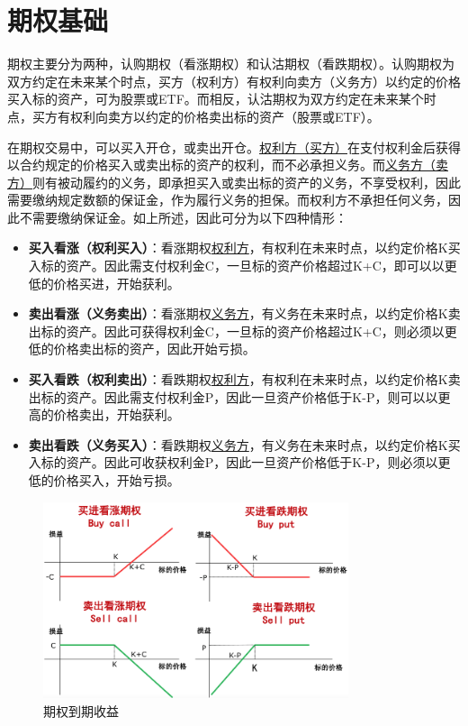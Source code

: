 \documentclass[11pt]{article}
\begin{document}
\maketitle
\tableofcontents

\section{期权基础}

期权主要分为两种，认购期权（看涨期权）和认沽期权（看跌期权）。认购期权为双方约定在未来某个时点，买方（权利方）有权利向卖方（义务方）以约定的价格买入标的资产，可为股票或ETF。而相反，认沽期权为双方约定在未来某个时点，买方有权利向卖方以约定的价格卖出标的资产（股票或ETF）。

在期权交易中，可以买入开仓，或卖出开仓。\uline{权利方（买方）}在支付权利金后获得以合约规定的价格买入或卖出标的资产的权利，而不必承担义务。而\uline{义务方（卖方）}则有被动履约的义务，即承担买入或卖出标的资产的义务，不享受权利，因此需要缴纳规定数额的保证金，作为履行义务的担保。而权利方不承担任何义务，因此不需要缴纳保证金。如上所述，因此可分为以下四种情形：
\begin{itemize}
    \item \textbf{买入看涨（权利买入）}：看涨期权\uline{权利方}，有权利在未来时点，以约定价格K买入标的资产。因此需支付权利金C，一旦标的资产价格超过K+C，即可以以更低的价格买进，开始获利。
    \item \textbf{卖出看涨（义务卖出）}：看涨期权\uline{义务方}，有义务在未来时点，以约定价格K卖出标的资产。因此可获得权利金C，一旦标的资产价格超过K+C，则必须以更低的价格卖出标的资产，因此开始亏损。
    \item \textbf{买入看跌（权利卖出）}：看跌期权\uline{权利方}，有权利在未来时点，以约定价格K卖出标的资产。因此需支付权利金P，因此一旦资产价格低于K-P，则可以以更高的价格卖出，开始获利。
    \item \textbf{卖出看跌（义务买入）}：看跌期权\uline{义务方}，有义务在未来时点，以约定价格K买入标的资产。因此可收获权利金P，因此一旦资产价格低于K-P，则必须以更低的价格买入，开始亏损。
\end{itemize}

\begin{figure}[H]
    \centering
    \includegraphics[width=0.8\textwidth]{fig/options_maturity_profit.png}
    \caption{期权到期收益}
    \label{fig:options_maturity_profit}
\end{figure}
\end{document}
